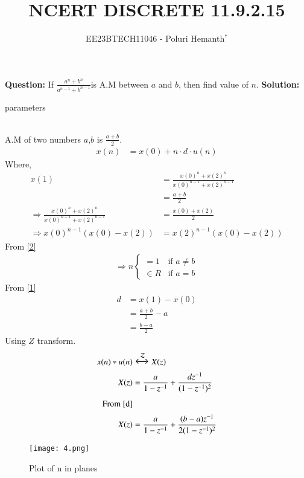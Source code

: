 \documentclass[journal,12pt,twocolumn]{IEEEtran}
\theoremstyle{remark}
\begin{document}

\vspace{3cm}


\title{NCERT DISCRETE 11.9.2.15}
\author{EE23BTECH11046 - Poluri Hemanth$^{*}$}
\maketitle
\textbf{Question:}
If \( \frac{a^n +b^n}{a^{n-1} + b^{n-1}}\)is A.M between $a$ and $b$, then find value of $n$.
\break
\textbf{Solution:}
\begin{table}[h!]
        
        \caption{parameters}
\end{table}
\\A.M of two numbers $a$,$b$ is $\frac{a+b}{2}$.
\begin{align}
	x(n)&=x(0)+n\cdot d\cdot u(n)\label{1}
\end{align}
Where,
\begin{align}
	x(1)&=\frac{x(0)^n +x(2)^n}{x(0)^{n-1} + x(2)^{n-1}}\label{r}\\ 
	&=\frac{a+b}{2}\\
	\Rightarrow\frac{x(0)^n +x(2)^n}{x(0)^{n-1} + x(2)^{n-1}}&= \frac{x(0)+x(2)}{2}  \\
    \Rightarrow x(0)^{n-1}(x(0)-x(2))&=x(2)^{n-1}(x(0)-x(2))\label{2}
\end{align}
From \eqref{2}
\begin{align}
        \Rightarrow n
        \begin{cases}
                =1  &\text{if } a\neq b\\
                \in R &\text{if } a=b
        \end{cases}
\end{align}
From \eqref{1}\\
\begin{align}
	d&=x(1)-x(0)\\
	&=\frac{a+b}{2}-a\\
	&=\frac{b-a}{2}\label{d}
\end{align}
Using $Z$ transform.
\begin{align}
	x(n)*u(n)&\Large\xleftrightarrow{\mathcal{Z}}X(z)\\
	X(z)&=\frac{a}{1-z^{-1}}+\frac{dz^{-1}}{(1-z^{-1})^2}\label{8}\\
	\notag\text{From \eqref{d}}\\
	X(z)&=\frac{a}{1-z^{-1}}+\frac{(b-a)z^{-1}}{2(1-z^{-1})^2}
\end{align}
\begin{figure}[h]
	\centering
	\texttt{[image: 4.png]}
	\caption{Plot of n in planes}
	\label{solution}
\end{figure}

 
\end{document}
